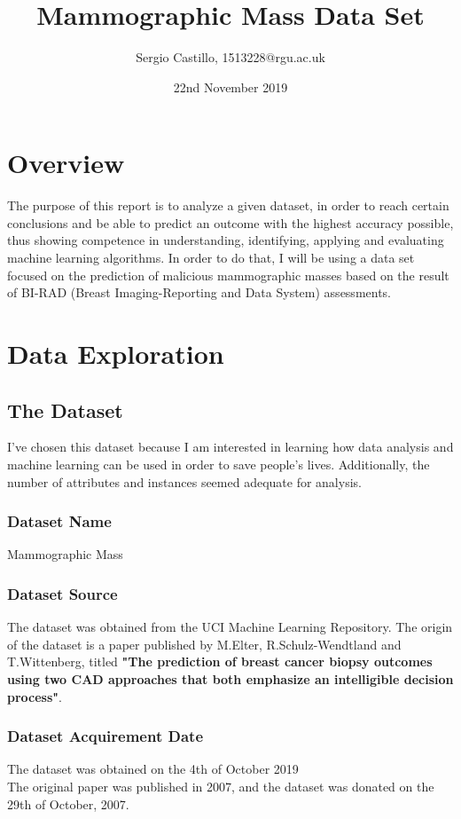 \documentclass[a4paper,12pt]{article}\usepackage[]{graphicx}\usepackage[]{color}
\title{\textbf{\Huge Mammographic Mass Data Set}}
\author{\Large Sergio Castillo, 1513228@rgu.ac.uk}
\date{22nd November 2019}
\begin{document}



\tableofcontents
\newpage
{}

\section{Overview}\label{overview}
The purpose of this report is to analyze a given dataset, in order to reach certain conclusions and be able to predict an outcome with the highest accuracy possible, thus showing competence in understanding, identifying, applying and evaluating machine learning algorithms. In order to do that, I will be using a data set focused on the prediction of malicious mammographic masses based on the result of BI-RAD (Breast Imaging-Reporting and Data System) assessments.

\section{Data Exploration}\label{data_exploration}

\subsection{The Dataset}\label{dataset}
I've chosen this dataset because I am interested in learning how data analysis and machine learning can be used in order to save people's lives. Additionally, the number of attributes and instances seemed adequate for analysis.

\subsubsection{Dataset Name}\label{name}
Mammographic Mass

\subsubsection{Dataset Source}\label{source}
The dataset was obtained from the UCI Machine Learning Repository\cite{datasetOrigin}.
The origin of the dataset is a paper published by M.Elter, R.Schulz-Wendtland and T.Wittenberg, titled \textbf{"The prediction of breast cancer biopsy outcomes using two CAD approaches that both emphasize an intelligible decision process"}\cite{researchPaper}. 

\subsubsection{Dataset Acquirement Date}\label{date}
The dataset was obtained on the 4th of October 2019\\
The original paper was published in 2007, and the dataset was donated on the 29th of October, 2007.
\end{document}

